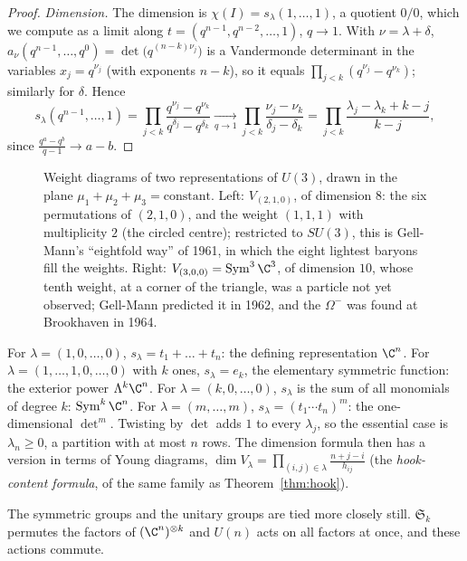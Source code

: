 \begin{proof}
\emph{Dimension.} The dimension is $\chi(I)=s_\lambda(1,\dots,1)$, a quotient $0/0$, which we compute as a limit along $t=(q^{n-1},q^{n-2},\dots,1)$, $q\to1$. With $\nu=\lambda+\delta$, $a_\nu(q^{n-1},\dots,q^0)=\det\bigl(q^{(n-k)\nu_j}\bigr)$ is a Vandermonde
determinant in the variables $x_j=q^{\nu_j}$ (with exponents $n-k$), so it equals $\prod_{j<k}(q^{\nu_j}-q^{\nu_k})$; similarly for $\delta$. Hence
\[
s_\lambda(q^{n-1},\dots,1)=\prod_{j<k}\frac{q^{\nu_j}-q^{\nu_k}}{q^{\delta_j}-q^{\delta_k}}\xrightarrow[q\to1]{}\prod_{j<k}\frac{\nu_j-\nu_k}{\delta_j-\delta_k}=\prod_{j<k}\frac{\lambda_j-\lambda_k+k-j}{k-j},
\]
since $\frac{q^a-q^b}{q-1}\to a-b$.
\end{proof}

\begin{figure}[ht]
\centering
{}
\caption{Weight diagrams of two representations of $U(3)$, drawn in the plane $\mu_1+\mu_2+\mu_3=\text{constant}$. Left: $V_{(2,1,0)}$, of dimension $8$: the six permutations of $(2,1,0)$, and the weight $(1,1,1)$ with multiplicity $2$ (the circled centre); restricted to $SU(3)$,
this is Gell-Mann's ``eightfold way'' of 1961, in which the eight lightest baryons fill the weights. Right: $V_{(3,0,0)}=\operatorname{Sym}^3\C^3$, of dimension $10$, whose tenth weight, at a corner of the triangle, was a particle not yet observed; Gell-Mann
predicted it in 1962, and the $\Omega^-$ was found at Brookhaven in 1964.}
\label{fig:weights}
\end{figure}

For $\lambda=(1,0,\dots,0)$, $s_\lambda=t_1+\dots+t_n$: the defining representation $\C^n$. For $\lambda=(1,\dots,1,0,\dots,0)$ with $k$ ones, $s_\lambda=e_k$, the elementary symmetric function: the exterior power $\Lambda^k\C^n$. For $\lambda=(k,0,\dots,0)$, $s_\lambda$ is
the sum of all monomials of degree $k$: $\operatorname{Sym}^k\C^n$. For $\lambda=(m,\dots,m)$, $s_\lambda=(t_1\cdots t_n)^m$: the one-dimensional $\det^m$. Twisting by $\det$ adds $1$ to every $\lambda_j$, so the essential case is $\lambda_n\ge0$, a partition with at most
$n$ rows. The dimension formula then has a version in terms of Young diagrams, $\dim V_\lambda=\prod_{(i,j)\in\lambda}\frac{n+j-i}{h_{ij}}$ (the \emph{hook-content formula}, of the same family as Theorem~\ref{thm:hook}).

The symmetric groups and the unitary groups are tied more closely still. $\mathfrak S_k$ permutes the factors of $(\C^n)^{\otimes k}$ and $U(n)$ acts on all factors at once, and these actions commute.

